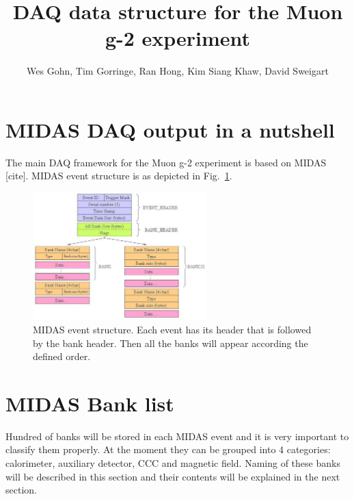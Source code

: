 

\author{Wes Gohn, Tim Gorringe, Ran Hong, Kim Siang Khaw, David Sweigart}
\title{\textbf{DAQ data structure for the Muon g-2 experiment}}


\maketitle


\tableofcontents
\newpage

\section{MIDAS DAQ output in a nutshell}
The main DAQ framework for the Muon g-2 experiment is based on MIDAS [cite]. 
MIDAS event structure is as depicted in Fig.~\ref{fig:MIDASEventStructure}.

\begin{figure}[htbp]
\centering
\includegraphics[width=0.6\textwidth]{pics/MIDASEventStructure.pdf} 
\caption{MIDAS event structure. Each event has its header that is followed by the bank header. Then all the banks will appear according the defined order.}\label{fig:MIDASEventStructure}
\end{figure}

\newpage
\section{MIDAS Bank list}

Hundred of banks will be stored in each MIDAS event and it is very important to classify them properly. At the moment they can be grouped into 4 categories: calorimeter, auxiliary detector, CCC and magnetic field. Naming of these banks will be described in this section and their contents will be explained in the next section.

